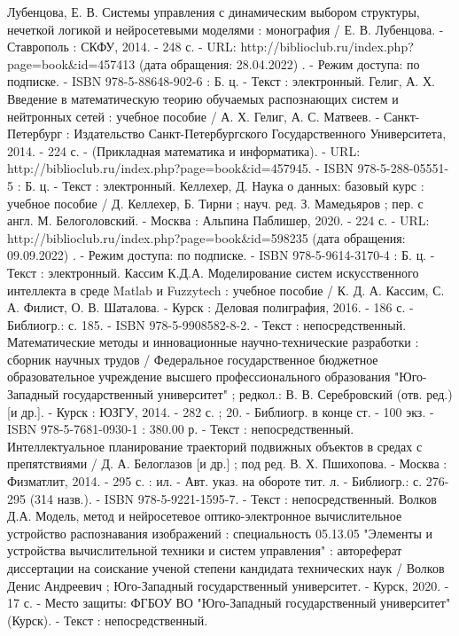 \begin{thebibliography}{50}
     Лубенцова, Е. В.    Системы управления с динамическим выбором структуры, нечеткой логикой и нейросетевыми моделями : монография / Е. В. Лубенцова. - Ставрополь : СКФУ, 2014. - 248 с. - URL: http://biblioclub.ru/index.php?page=book\&id=457413 (дата обращения: 28.04.2022) . - Режим доступа: по подписке. - ISBN 978-5-88648-902-6 : Б. ц. - Текст : электронный.
    Гелиг, А. Х.    Введение в математическую теорию обучаемых распознающих систем и нейтронных сетей : учебное пособие / А. Х. Гелиг, А. С. Матвеев. - Санкт-Петербург : Издательство Санкт-Петербургского Государственного Университета, 2014. - 224 с. - (Прикладная математика и информатика). - URL: http://biblioclub.ru/index.php?page=book\&id=457945. - ISBN 978-5-288-05551-5 : Б. ц. - Текст : электронный.
     Келлехер, Д.    Наука о данных: базовый курс : учебное пособие / Д. Келлехер, Б. Тирни ; науч. ред. З. Мамедьяров ; пер. с англ. М. Белоголовский. - Москва : Альпина Паблишер, 2020. - 224 с. - URL: http://biblioclub.ru/index.php?page=book\&id=598235 (дата обращения: 09.09.2022) . - Режим доступа: по подписке. - ISBN 978-5-9614-3170-4 : Б. ц. - Текст : электронный.
     Кассим К.Д.А.   Моделирование систем искусственного интеллекта в среде Matlab и Fuzzytech : учебное пособие / К. Д. А. Кассим, С. А. Филист, О. В. Шаталова. - Курск : Деловая полиграфия, 2016. - 186 с. - Библиогр.: с. 185. - ISBN 978-5-9908582-8-2. - Текст : непосредственный.
     Математические методы и инновационные научно-технические разработки : сборник научных трудов / Федеральное государственное бюджетное образовательное учреждение высшего профессионального образования "Юго-Западный государственный университет" ; редкол.: В. В. Серебровский (отв. ред.) [и др.]. - Курск : ЮЗГУ, 2014. - 282 с. ; 20. - Библиогр. в конце ст. - 100 экз. - ISBN 978-5-7681-0930-1 : 380.00 р. - Текст : непосредственный.
     Интеллектуальное планирование траекторий подвижных объектов в средах с препятствиями / Д. А. Белоглазов [и др.] ; под ред. В. Х. Пшихопова. - Москва : Физматлит, 2014. - 295 с. : ил. - Авт. указ. на обороте тит. л. - Библиогр.: с. 276-295 (314 назв.). - ISBN 978-5-9221-1595-7. - Текст : непосредственный.
     Волков Д.А.  Модель, метод и нейросетевое оптико-электронное вычислительное устройство распознавания изображений : специальность 05.13.05 "Элементы и устройства вычислительной техники и систем управления" : автореферат диссертации на соискание ученой степени кандидата технических наук / Волков Денис Андреевич ; Юго-Западный государственный университет. - Курск, 2020. - 17 с. - Место защиты: ФГБОУ ВО "Юго-Западный государственный университет" (Курск). - Текст : непосредственный.

\end{thebibliography}
